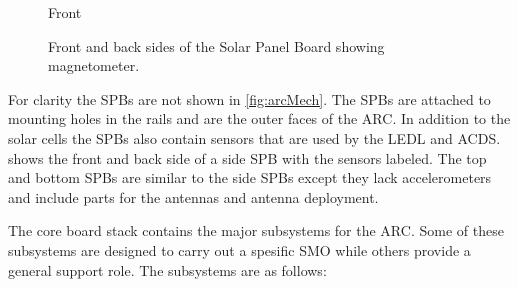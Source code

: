 \begin{figure}[!ht]
\begin{minipage}{0.30\linewidth}
\begin{itemize}
        \end{itemize}
        \vspace*{\fill}
    \end{minipage} \begin{minipage}{0.30\linewidth}
        \centering\large{Front}
    \end{minipage}

    
    \caption{Front and back sides of the Solar Panel Board showing magnetometer.}
    \label{fig:SPB}
\end{figure}

For clarity the \acp{SPB} are not shown in \cref{fig:arcMech}. The \acp{SPB} are attached to mounting holes in the rails and are the outer faces of the \ac{ARC}. In addition to the solar cells the \acp{SPB} also contain sensors that are used by the \ac{LEDL} and \ac{ACDS}.  shows the front and back side of a side \ac{SPB} with the sensors labeled. The top and bottom \acp{SPB} are similar to the side \acp{SPB} except they lack accelerometers and include parts for the antennas and antenna deployment.

The core board stack contains the major subsystems for the \ac{ARC}. Some of these subsystems are designed to carry out a spesific \ac{SMO} while others provide a general support role. The subsystems are as follows:

